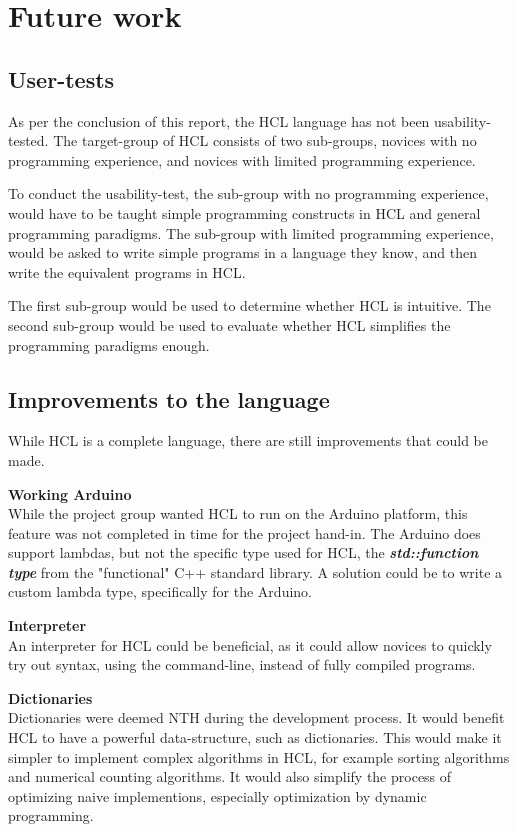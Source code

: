 \section{Future work}

\subsection{User-tests}
As per the conclusion of this report, the HCL language has not been usability-tested.
The target-group of HCL consists of two sub-groups, novices with no programming experience, and novices with limited programming experience.

To conduct the usability-test, the sub-group with no programming experience, would have to be taught simple programming constructs in HCL and general programming paradigms.
The sub-group with limited programming experience, would be asked to write simple programs in a language they know, and then write the equivalent programs in HCL.

The first sub-group would be used to determine whether HCL is intuitive.
The second sub-group would be used to evaluate whether HCL simplifies the programming paradigms enough.

\subsection{Improvements to the language}
While HCL is a complete language, there are still improvements that could be made.

\textbf{Working Arduino}\\
While the project group wanted HCL to run on the Arduino platform, this feature was not completed in time for the project hand-in.
The Arduino does support lambdas, but not the specific type used for HCL, the \textit{\textbf{std::function type}} from the "functional" C++ standard library.
A solution could be to write a custom lambda type, specifically for the Arduino.

\textbf{Interpreter}\\
An interpreter for HCL could be beneficial, as it could allow novices to quickly try out syntax, using the command-line, instead of fully compiled programs.

\textbf{Dictionaries}\\
Dictionaries were deemed NTH during the development process.
It would benefit HCL to have a powerful data-structure, such as dictionaries.
This would make it simpler to implement complex algorithms in HCL, for example sorting algorithms and numerical counting algorithms.
It would also simplify the process of optimizing naive implementions, especially optimization by dynamic programming.

